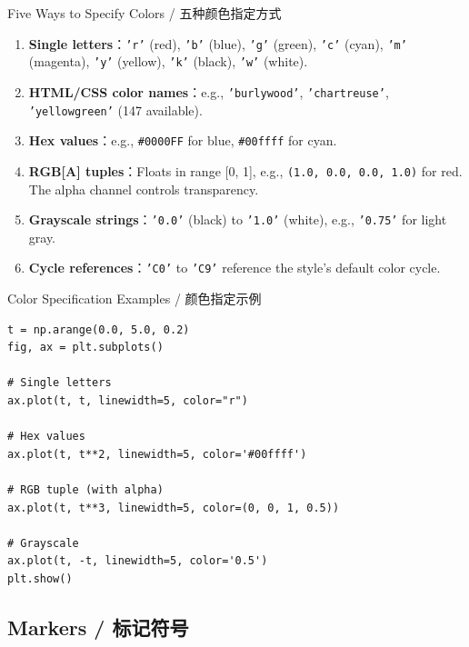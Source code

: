 \documentclass[11pt,a4paper]{article}
\begin{document}
\begin{concept}{Five Ways to Specify Colors / 五种颜色指定方式}
    \begin{enumerate}[itemsep=0.3em]
        \item \textbf{Single letters}：\texttt{'r'} (red), \texttt{'b'} (blue), \texttt{'g'} (green), \texttt{'c'} (cyan), \texttt{'m'} (magenta), \texttt{'y'} (yellow), \texttt{'k'} (black), \texttt{'w'} (white).
        \item \textbf{HTML/CSS color names}：e.g., \texttt{'burlywood'}, \texttt{'chartreuse'}, \texttt{'yellowgreen'} (147 available).
        \item \textbf{Hex values}：e.g., \texttt{\#0000FF} for blue, \texttt{\#00ffff} for cyan.
        \item \textbf{RGB[A] tuples}：Floats in range [0, 1], e.g., \texttt{(1.0, 0.0, 0.0, 1.0)} for red. The alpha channel controls transparency.
        \item \textbf{Grayscale strings}：\texttt{'0.0'} (black) to \texttt{'1.0'} (white), e.g., \texttt{'0.75'} for light gray.
        \item \textbf{Cycle references}：\texttt{'C0'} to \texttt{'C9'} reference the style's default color cycle.
    \end{enumerate}
\end{concept}

\begin{examplebox}{Color Specification Examples / 颜色指定示例}
\begin{lstlisting}
t = np.arange(0.0, 5.0, 0.2)
fig, ax = plt.subplots()

# Single letters
ax.plot(t, t, linewidth=5, color="r")

# Hex values
ax.plot(t, t**2, linewidth=5, color='#00ffff')

# RGB tuple (with alpha)
ax.plot(t, t**3, linewidth=5, color=(0, 0, 1, 0.5))

# Grayscale
ax.plot(t, -t, linewidth=5, color='0.5')
plt.show()
\end{lstlisting}
\end{examplebox}

\subsection{Markers / 标记符号}
\end{document}
